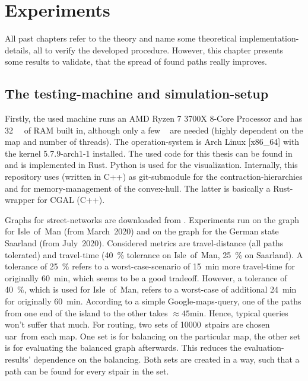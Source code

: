 \chapter{Experiments}
\label{chap:experiments}

All past chapters refer to the theory and name some theoretical implementation-details, all to verify the developed procedure.
However, this chapter presents some results to validate, that the spread of found paths really improves.

\section{The testing-machine and simulation-setup}

    Firstly, the used machine runs an AMD Ryzen 7 3700X 8-Core Processor and has \si{\num{32} \giga\byte} of RAM built in, although only a few \si{\giga\byte} are needed (highly dependent on the map and number of threads).
    The operation-system is Arch Linux [x86\_64] with the kernel 5.7.9-arch1-1 installed.
    The used code for this thesis can be found in \cite{github:dominicparga/osmgraphing} and is implemented in Rust.
    Python is used for the visualization.
    Internally, this repository uses \cite{github:lesstat/multi-ch-constructor} (written in C++) as git-submodule for the \gls{contraction-hierarchies} and \cite{github:lesstat/nd-triangulation} for memory-management of the convex-hull.
    The latter is basically a Rust-wrapper for CGAL (C++).

    Graphs for street-networks are downloaded from \cite{osm}.
    Experiments run on the graph for Isle~of~Man (from March~2020) and on the graph for the German state Saarland (from July~2020).
    Considered \glspl{metric} are travel-distance (all paths tolerated) and travel-time (\si{40 \percent} tolerance on Isle~of~Man, \si{25 \percent} on Saarland).
    A tolerance of \si{25 \percent} refers to a worst-case-scenario of \si{15 \minute} more travel-time for originally \si{60 \minute}, which seems to be a good tradeoff.
    However, a tolerance of \si{40 \percent}, which is used for Isle~of~Man, refers to a worst-case of additional \si{24 \minute} for originally \si{60 \minute}.
    According to a simple Google-maps-query, one of the paths from one end of the island to the other takes $\approx \si{45 \minute}$.
    Hence, typical queries won't suffer that much.
    For routing, two sets of \num{10000}~\glspl{stpair} are chosen \gls{uar}\ from each map.
    One set is for \gls{balancing} on the particular map, the other set is for evaluating the balanced graph afterwards.
    This reduces the evaluation-results' dependence on the \gls{balancing}.
    Both sets are created in a way, such that a path can be found for every \gls{stpair} in the set.

